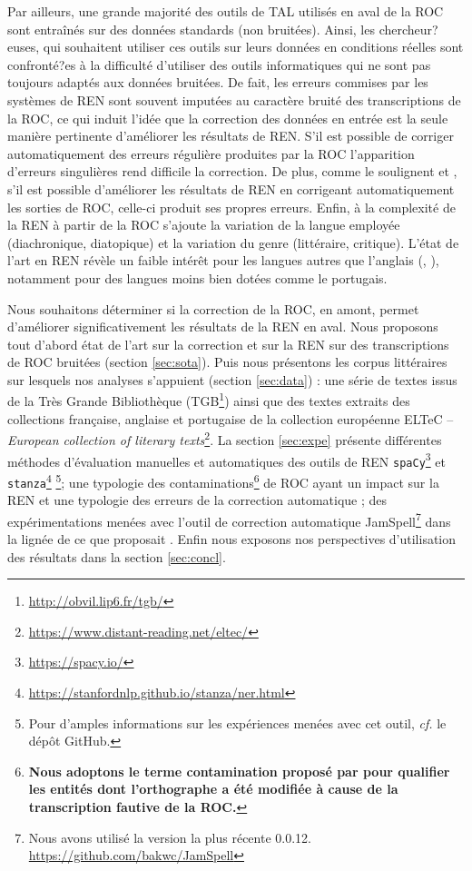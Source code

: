 Par ailleurs, une grande majorité des outils de TAL utilisés en aval de la ROC sont entraînés sur des données standards (non bruitées). Ainsi, les chercheur?euses, qui souhaitent utiliser ces outils sur leurs données en conditions réelles sont confronté?es à la difficulté d'utiliser des outils informatiques qui ne sont pas toujours adaptés aux données bruitées. De fait, les erreurs commises par les systèmes de REN sont souvent imputées au caractère bruité des transcriptions de la ROC, ce qui induit l'idée que la correction des données en entrée est la seule manière pertinente d'améliorer les résultats de REN. 
S'il est possible de corriger automatiquement des erreurs régulière produites par la ROC l'apparition d’erreurs singulières rend difficile la correction. De plus, comme le soulignent \cite{huynh:hal-03034484} et \cite{petkovic:hal-04063970}, s'il est possible d'améliorer les résultats de REN en corrigeant automatiquement les sorties de ROC, celle-ci produit ses propres erreurs. Enfin, à la complexité de la REN à partir de la ROC s'ajoute la variation de la langue employée (diachronique, diatopique) %
et la variation du genre (littéraire, critique). L'état de l'art en REN révèle un faible intérêt pour les langues autres que l’anglais (\cite{lejeune:hal-01294127}, \cite{rahimi-etal-2019-massively}), notamment pour des langues moins bien dotées comme le portugais.

Nous souhaitons déterminer si la correction de la ROC, en amont, permet d’améliorer  significativement les résultats de la REN en aval. Nous proposons tout d'abord état de l'art sur la correction et sur la REN sur des transcriptions de ROC bruitées (section \ref{sec:sota}). Puis nous présentons les corpus littéraires sur lesquels nos analyses s'appuient (section \ref{sec:data}) : une série de textes issus de la Très Grande Bibliothèque (TGB\footnote{\url{http://obvil.lip6.fr/tgb/}}) ainsi que des textes extraits des collections française, anglaise et portugaise de la collection européenne ELTeC -- \textit{European collection of literary texts}\footnote{\url{https://www.distant-reading.net/eltec/}}. La section \ref{sec:expe} présente différentes méthodes d'évaluation manuelles et automatiques des outils de REN \texttt{spaCy}\footnote{\url{https://spacy.io/}} \cite{ines_montani_2023_7715077} et \texttt{stanza}\footnote{\url{https://stanfordnlp.github.io/stanza/ner.html}} \cite{qi2020stanza}\footnote{Pour d'amples informations sur les expériences menées avec cet outil, \textit{cf.} le dépôt GitHub.}; une typologie des contaminations\footnote{\textbf{Nous adoptons le terme contamination proposé par \cite{hamdi:hal-03615997} pour qualifier les entités dont l'orthographe a été modifiée à cause de la transcription fautive de la ROC.}} de ROC ayant un impact sur la REN et une typologie des erreurs de la correction automatique ; des expérimentations menées avec l’outil de correction automatique JamSpell\footnote{Nous avons utilisé la version la plus récente 0.0.12. \url{https://github.com/bakwc/JamSpell}} dans la lignée de ce que proposait \cite{petkovic2022impact}. Enfin nous exposons nos perspectives d’utilisation des résultats dans la section \ref{sec:concl}.

